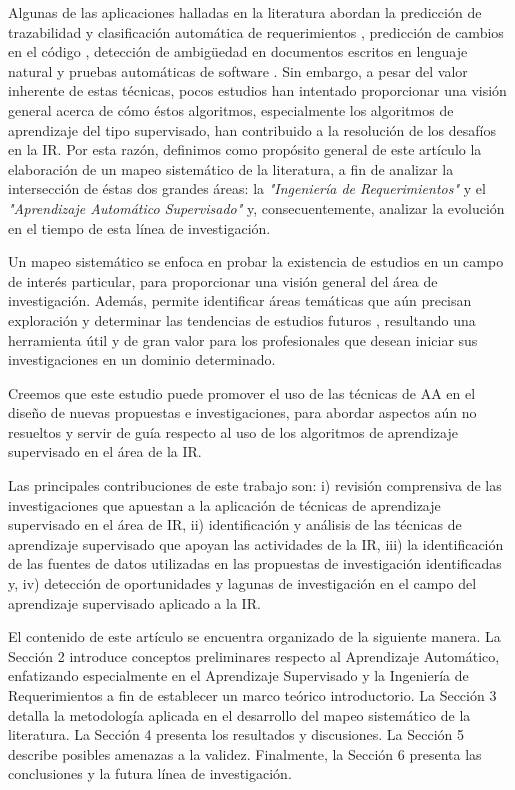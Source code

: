\documentclass[journal]{IEEEtran}
\begin{document}
Algunas de las aplicaciones halladas en la literatura abordan la predicción de trazabilidad y clasificación automática de requerimientos \cite{Li201725}, predicción de cambios en el código \cite{giger2012can}, detección de ambigüedad en documentos escritos en lenguaje natural \cite{yang2010extending} y pruebas automáticas de software \cite{Felbinger201623}. Sin embargo, a pesar del valor inherente de estas técnicas, pocos estudios han intentado proporcionar una visión general acerca de cómo éstos algoritmos, especialmente los algoritmos de aprendizaje del tipo supervisado, han contribuido a la resolución de los desafíos en la IR. Por esta razón, definimos como propósito general de este artículo la elaboración de un mapeo sistemático de la literatura, a fin de analizar la intersección de éstas dos grandes áreas: la \textit{"Ingeniería de Requerimientos"} y el \textit{"Aprendizaje Automático Supervisado"} y, consecuentemente, analizar la evolución en el tiempo de esta línea de investigación. 

Un mapeo sistemático se enfoca en probar la existencia de estudios en un campo de interés particular, para proporcionar una visión general del área de investigación. Además, permite identificar áreas temáticas que aún precisan exploración y determinar las tendencias de estudios futuros \cite{petersen2008systematic}, resultando una herramienta útil y de gran valor para los profesionales que desean iniciar sus investigaciones en un dominio determinado.

Creemos que este estudio puede promover el uso de las técnicas de AA en el diseño de nuevas propuestas e investigaciones, para abordar aspectos aún no resueltos y servir de guía respecto al uso de los algoritmos de aprendizaje supervisado en el área de la IR.

Las principales contribuciones de este trabajo son: i) revisión comprensiva de las investigaciones que apuestan a la aplicación de técnicas de aprendizaje supervisado en el área de IR, ii) identificación y análisis de las técnicas de aprendizaje supervisado que apoyan las actividades de la IR, iii) la identificación de las fuentes de datos utilizadas en las propuestas de investigación identificadas y, iv) detección de oportunidades y lagunas de investigación en el campo del aprendizaje supervisado aplicado a la IR.

El contenido de este artículo se encuentra organizado de la siguiente manera. La Sección 2 introduce conceptos preliminares respecto al Aprendizaje Automático, enfatizando especialmente en el Aprendizaje Supervisado y la Ingeniería de Requerimientos a fin de establecer un marco teórico introductorio. La Sección 3 detalla la metodología aplicada en el desarrollo del mapeo sistemático de la literatura. La Sección 4 presenta los resultados y discusiones. La Sección 5 describe posibles amenazas a la validez. Finalmente, la Sección 6 presenta las conclusiones y la futura línea de investigación.  
\end{document}
